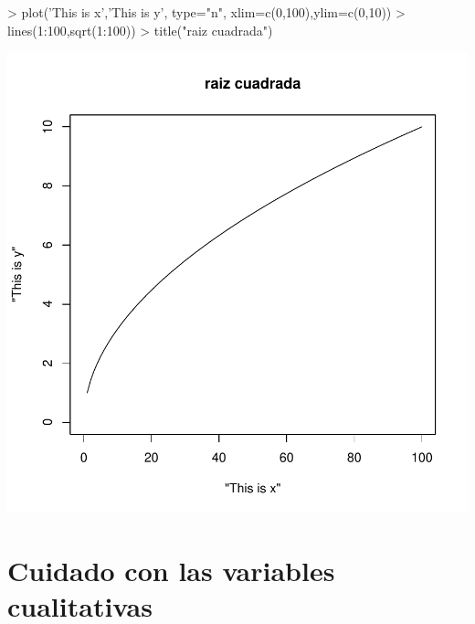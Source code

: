 \documentclass[12pt]{article}
\begin{document}
\begin{Schunk}
\begin{Sinput}
> plot('This is x','This is y', type="n", xlim=c(0,100),ylim=c(0,10))
> lines(1:100,sqrt(1:100))
> title("raiz cuadrada")
\end{Sinput}
\end{Schunk}
\includegraphics{ensayo-015}
  \section{Cuidado con las variables cualitativas}
\end{document}

